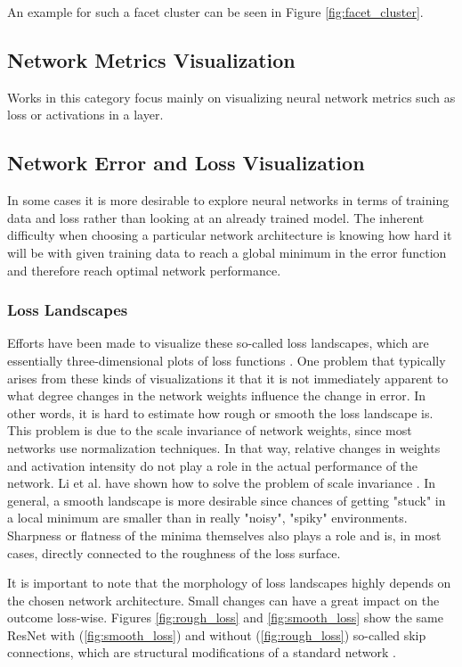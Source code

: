\documentclass{acmsiggraph}               %
\begin{document}
An example for such a facet cluster can be seen in Figure \ref{fig:facet_cluster}.


\subsection{Network Metrics Visualization}
Works in this category focus mainly on visualizing neural network metrics such as loss or activations in a layer.

\subsection{Network Error and Loss Visualization}
In some cases it is more desirable to explore neural networks in terms of training data and loss rather than looking at an already trained model.
The inherent difficulty when choosing a particular network architecture is knowing how hard it will be with given training data to reach a global minimum in the error function and therefore reach optimal network performance.

\subsubsection{Loss Landscapes}
Efforts have been made to visualize these so-called loss landscapes, which are essentially three-dimensional plots of loss functions \cite{Li2017}.
One problem that typically arises from these kinds of visualizations it that it is not immediately apparent to what degree changes in the network weights influence the change in error. In other words, it is hard to estimate how rough or smooth the loss landscape is. This problem is due to the scale invariance of network weights, since most networks use normalization techniques. In that way, relative changes in weights and activation intensity do not play a role in the actual performance of the network. Li et al. have shown how to solve the problem of scale invariance \cite{Li2017}. In general, a smooth landscape is more desirable since chances of getting "stuck" in a local minimum are smaller than in really "noisy", "spiky" environments. Sharpness or flatness of the minima themselves also plays a role and is, in most cases, directly connected to the roughness of the loss surface.

It is important to note that the morphology of loss landscapes highly depends on the chosen network architecture. Small changes can have a great impact on the outcome loss-wise. Figures \ref{fig:rough_loss} and \ref{fig:smooth_loss} show the same ResNet with (\ref{fig:smooth_loss}) and without (\ref{fig:rough_loss}) so-called skip connections, which are structural modifications of a standard network \cite{He2015}.
\end{document}
